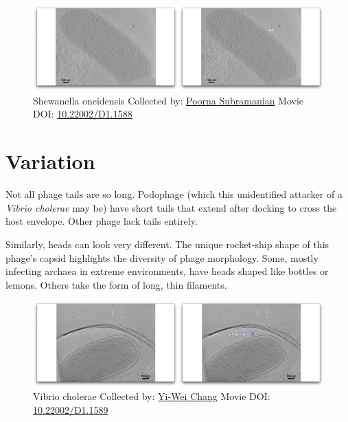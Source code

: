 \documentclass[]{tufte-book}
\begin{document}
\begin{figure}
\includegraphics{movie_stills/10_3} \caption[Shewanella oneidensis Collected by:
\protect\hyperlink{poorna_subramanian}{Poorna Subramanian} Movie DOI:
\href{https://doi.org/10.22002/D1.1588}{10.22002/D1.1588}]{Shewanella oneidensis Collected by:
\protect\hyperlink{poorna_subramanian}{Poorna Subramanian} Movie DOI:
\href{https://doi.org/10.22002/D1.1588}{10.22002/D1.1588}}\label{fig:10-3}
\end{figure}

\section{Variation}\label{variation-1}

Not all phage tails are so long. Podophage (which this unidentified
attacker of a \emph{Vibrio cholerae} may be) have short tails that
extend after docking to cross the host envelope. Other phage lack tails
entirely.

Similarly, heads can look very different. The unique rocket-ship shape
of this phage's capsid highlights the diversity of phage morphology.
Some, mostly infecting archaea in extreme environments, have heads
shaped like bottles or lemons. Others take the form of long, thin
filaments.





\begin{figure}
\includegraphics{movie_stills/10_4} \caption[Vibrio cholerae Collected by:
\protect\hyperlink{yi-wei_chang}{Yi-Wei Chang} Movie DOI:
\href{https://doi.org/10.22002/D1.1589}{10.22002/D1.1589}]{Vibrio cholerae Collected by:
\protect\hyperlink{yi-wei_chang}{Yi-Wei Chang} Movie DOI:
\href{https://doi.org/10.22002/D1.1589}{10.22002/D1.1589}}\label{fig:10-4}
\end{figure}
\end{document}
